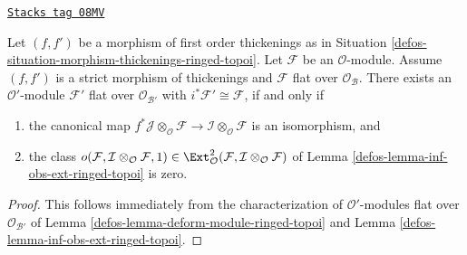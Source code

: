 \begin{lemma}
\label{defos-lemma-inf-obs-ext-rel-ringed-topoi}
\href{https://stacks.math.columbia.edu/tag/08MV}{\texttt{Stacks tag 08MV}}

Let $(f, f')$ be a morphism of first order thickenings as in
Situation \ref{defos-situation-morphism-thickenings-ringed-topoi}.
Let $\mathcal{F}$ be an $\mathcal{O}$-module. Assume
$(f, f')$ is a strict morphism of thickenings
and $\mathcal{F}$ flat over $\mathcal{O}_\mathcal{B}$. There exists an
$\mathcal{O}'$-module $\mathcal{F}'$ flat over $\mathcal{O}_{\mathcal{B}'}$
with $i^*\mathcal{F}' \cong \mathcal{F}$, if and only if
\begin{enumerate}
\item the canonical map
$f^*\mathcal{J} \otimes_\mathcal{O} \mathcal{F} \to
\mathcal{I} \otimes_\mathcal{O} \mathcal{F}$
is an isomorphism, and
\item the class
$o(\mathcal{F}, \mathcal{I} \otimes_\mathcal{O} \mathcal{F}, 1)
\in \Ext^2_\mathcal{O}(
\mathcal{F}, \mathcal{I} \otimes_\mathcal{O} \mathcal{F})$
of Lemma \ref{defos-lemma-inf-obs-ext-ringed-topoi} is zero.
\end{enumerate}
\end{lemma}

\begin{proof}

This follows immediately from the characterization of
$\mathcal{O}'$-modules flat over $\mathcal{O}_{\mathcal{B}'}$ of
Lemma \ref{defos-lemma-deform-module-ringed-topoi} and
Lemma \ref{defos-lemma-inf-obs-ext-ringed-topoi}.
\end{proof}

